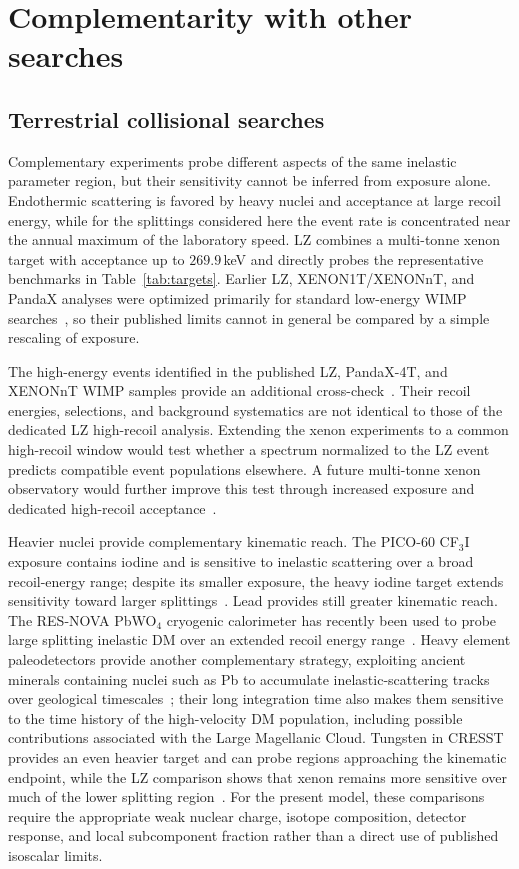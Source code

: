 \documentclass[aps,prd,reprint,preprintnumbers,superscriptaddress,nofootinbib,floatfix]{revtex4-2}
\begin{document}
\section{Complementarity with other searches}
\label{sec:complementarity}

\subsection{Terrestrial collisional searches}

Complementary experiments probe different aspects of the same inelastic parameter region, but their sensitivity cannot be inferred from exposure alone. Endothermic scattering is favored by heavy nuclei and acceptance at large recoil energy, while for the splittings considered here the event rate is concentrated near the annual maximum of the laboratory speed. LZ combines a multi-tonne xenon target with acceptance up to $269.9$\,keV and directly probes the representative benchmarks in Table~\ref{tab:targets}. Earlier LZ, XENON1T/XENONnT, and PandaX analyses were optimized primarily for standard low-energy WIMP searches~\cite{LZ:2024zvo,XENON:2025vwd,PandaX:2024qfu}, so their published limits cannot in general be compared by a simple rescaling of exposure.

The high-energy events identified in the published LZ, PandaX-4T, and XENONnT WIMP samples provide an additional cross-check~\cite{An:2025bby}. Their recoil energies, selections, and background systematics are not identical to those of the dedicated LZ high-recoil analysis. Extending the xenon experiments to a common high-recoil window would test whether a spectrum normalized to the LZ event predicts compatible event populations elsewhere. A future multi-tonne xenon observatory would further improve this test through increased exposure and dedicated high-recoil acceptance~\cite{Aalbers:2022dzr}.

Heavier nuclei provide complementary kinematic reach. The PICO-60 CF$_3$I exposure contains iodine and is sensitive to inelastic scattering over a broad recoil-energy range; despite its smaller exposure, the heavy iodine target extends sensitivity toward larger splittings~\cite{PICO:2023uff}. Lead provides still greater kinematic reach. The RES-NOVA PbWO$_4$ cryogenic calorimeter has recently been used to probe large splitting inelastic DM over an extended recoil energy range~\cite{Alloni:2026xdf}. Heavy element paleodetectors provide another complementary strategy, exploiting ancient minerals containing nuclei such as Pb to accumulate inelastic-scattering tracks over geological timescales~\cite{Graham:2026ivn}; their long integration time also makes them sensitive to the time history of the high-velocity DM population, including possible contributions associated with the Large Magellanic Cloud. Tungsten in CRESST provides an even heavier target and can probe regions approaching the kinematic endpoint, while the LZ comparison shows that xenon remains more sensitive over much of the lower splitting region~\cite{LZ:2026axp}. For the present model, these comparisons require the appropriate weak nuclear charge, isotope composition, detector response, and local subcomponent fraction rather than a direct use of published isoscalar limits.
\end{document}
